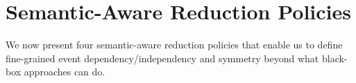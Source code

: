 \section{Semantic-Aware Reduction Policies}
\label{sam-pol}



We now present four semantic-aware reduction policies that enable us to
define fine-grained event dependency/independency and symmetry beyond
what black-box approaches can do.













%
%


